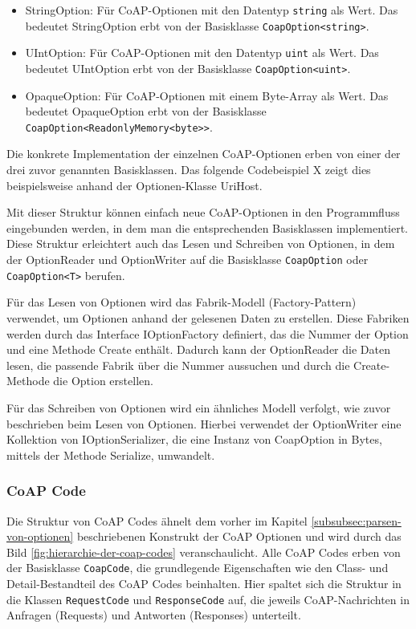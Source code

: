 \begin{itemize}
    \item StringOption: Für CoAP-Optionen mit den Datentyp \texttt{string} als Wert. Das bedeutet StringOption erbt von der Basisklasse \texttt{CoapOption<string>}.
    \item UIntOption: Für CoAP-Optionen mit den Datentyp \texttt{uint} als Wert. Das bedeutet UIntOption erbt von der Basisklasse \texttt{CoapOption<uint>}.
    \item OpaqueOption: Für CoAP-Optionen mit einem Byte-Array als Wert. Das bedeutet OpaqueOption erbt von der Basisklasse \texttt{CoapOption<ReadonlyMemory<byte>>}.
\end{itemize}

Die konkrete Implementation der einzelnen CoAP-Optionen erben von einer der drei zuvor genannten Basisklassen. Das folgende Codebeispiel X zeigt dies beispielsweise anhand der Optionen-Klasse UriHost.

Mit dieser Struktur können einfach neue CoAP-Optionen in den Programmfluss eingebunden werden, in dem man die entsprechenden Basisklassen implementiert. Diese Struktur erleichtert auch das Lesen und Schreiben von Optionen, in dem der OptionReader und OptionWriter auf die Basisklasse \texttt{CoapOption} oder \texttt{CoapOption<T>} berufen.

Für das Lesen von Optionen wird das Fabrik-Modell (Factory-Pattern) verwendet, um Optionen anhand der gelesenen Daten zu erstellen. Diese Fabriken werden durch das Interface IOptionFactory definiert, das die Nummer der Option und eine Methode Create enthält. Dadurch kann der OptionReader die Daten lesen, die passende Fabrik über die Nummer aussuchen und durch die Create-Methode die Option erstellen.

Für das Schreiben von Optionen wird ein ähnliches Modell verfolgt, wie zuvor beschrieben beim Lesen von Optionen. Hierbei verwendet der OptionWriter eine Kollektion von IOptionSerializer, die eine Instanz von CoapOption in Bytes, mittels der Methode Serialize, umwandelt.

\subsubsection{CoAP Code}
\label{subsubsec:coap-code}

Die Struktur von CoAP Codes ähnelt dem vorher im Kapitel \ref{subsubsec:parsen-von-optionen} beschriebenen Konstrukt der CoAP Optionen und wird durch das Bild \ref{fig:hierarchie-der-coap-codes} veranschaulicht. Alle CoAP Codes erben von der Basisklasse \texttt{CoapCode}, die grundlegende Eigenschaften wie den Class- und Detail-Bestandteil des CoAP Codes beinhalten. Hier spaltet sich die Struktur in die Klassen \texttt{RequestCode} und \texttt{ResponseCode} auf, die jeweils CoAP-Nachrichten in Anfragen (Requests) und Antworten (Responses) unterteilt.

